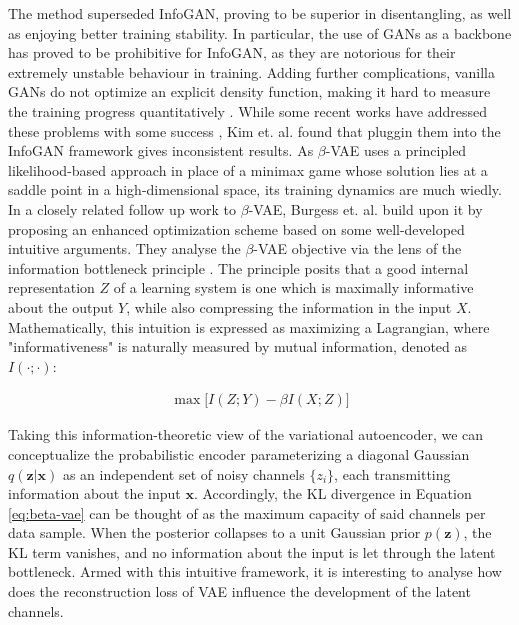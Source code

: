 \documentclass{report}
\begin{document}
\bigskip

\noindent The method superseded InfoGAN, proving to be superior in disentangling, as well as enjoying better training stability. In particular, the use of GANs as a backbone has proved to be prohibitive for InfoGAN, as they are notorious for their extremely unstable behaviour in training. Adding further complications, vanilla GANs do not optimize an explicit density function, making it hard to measure the training progress quantitatively \cite{gan-tutorial}. While some recent works have addressed these problems with some success \cite{wgan, wgan-gp, began}, Kim et. al. \cite{factor-vae} found that pluggin them into the InfoGAN framework gives inconsistent results. As $\beta$-VAE uses a principled likelihood-based approach in place of a minimax game whose solution lies at a saddle point in a high-dimensional space, its training dynamics are much wiedly. \\

\noindent In a closely related follow up work to $\beta$-VAE, Burgess et. al. \cite{understanding-beta-vae} build upon it by proposing an enhanced optimization scheme based on some well-developed intuitive arguments. They analyse the $\beta$-VAE objective via the lens of the information bottleneck principle \cite{tishby-ib}. The principle posits that a good internal representation $Z$ of a learning system is one which is maximally informative about the output $Y$, while also compressing the information in the input $X$. Mathematically, this intuition is expressed as maximizing a Lagrangian, where "informativeness" is naturally measured by mutual information, denoted as $I(\cdot; \cdot)$:

\begin{equation}
\begin{gathered}
\max \big[ I(Z; Y) - \beta I(X;Z) \big]
\end{gathered}
\label{eq:ib}
\end{equation}

\bigskip

\noindent Taking this information-theoretic view of the variational autoencoder, we can conceptualize the probabilistic encoder parameterizing a diagonal Gaussian $q(\boldsymbol{z}|\boldsymbol{x})$ as an independent set of noisy channels $\{z_i\}$, each transmitting information about the input $\boldsymbol{x}$. Accordingly, the KL divergence in Equation \ref{eq:beta-vae} can be thought of as the maximum capacity of said channels per data sample. When the posterior collapses to a unit Gaussian prior $p(\boldsymbol{z})$, the KL term vanishes, and no information about the input is let through the latent bottleneck. Armed with this intuitive framework, it is interesting to analyse how does the reconstruction loss of VAE influence the development of the latent channels. \\
\end{document}
